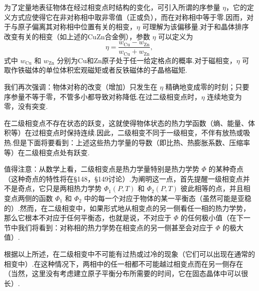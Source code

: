 为了定量地表征物体在经过相变点时结构的变化，可引入所谓的序参量 $\eta$，它的定义方式应使得它在非对称相中取非零值（正或负），而在对称相中等于零.因而，对于与原子偏离其对称相中位置有关的相变，$\eta$ 可理解为该偏移量.对于和晶体排序改变有关的相变（如上述的CuZn合金例），参数 $\eta$ 可以定义为
\begin{equation*}
  \eta=\frac{w_{\mathrm{Cu}}-w_{\mathrm{Zn}}}{w_{\mathrm{Cu}}+w_{\mathrm{Zn}}},
\end{equation*}
式中 $w_{\mathrm{Cu}}$ 和 $w_{\mathrm{Zn}}$ 分别为Cu和Zn原子处于任一给定格点的概率.对于磁相变，$\eta$ 可取作铁磁体的单位体积宏观磁矩或者反铁磁体的子晶格磁矩.

我们再次强调：物体对称的改变（增加）只发生在 $\eta$ 精确地变成零的时刻；只要序参量不等于零，不管多小都导致对称降低.在过二级相变点时，$\eta$ 连续地变为零，没有突变.

在二级相变点不存在状态的跃变，这就使得物体状态的热力学函数（熵、能量、体积等）在过相变点时保持连续.因此，二级相变不同于一级相变，不伴有放热或吸热.但是下面将要看到：上述这些热力学量的导数（即比热、热膨胀系数、压缩率等）在二级相变点处有跃变.

值得注意：从数学上看，二级相变点是热力学量特别是热力学势 $\Phi$ 的某种奇点（这种奇点的特性将在§148，§149讨论）.为阐明这一点，首先提醒一级相变点并不是奇点，它只是两相热力学势 $\Phi_1(P,T)$ 和 $\Phi_2(P,T)$ 彼此相等的点，并且相变点两侧的函数 $\Phi_1$ 和 $\Phi_2$ 中的每一个对应于物体的某一平衡态（虽然可能是亚稳的）.然而，在二级相变中，如果形式地从相变点的另一侧看任一相的热力学势，那么它根本不对应于任何平衡态，也就是说，不对应于 $\Phi$ 的任何极小值（在下一节中我们将看到：对称相的热力学势在相变点的另一侧甚至会对应于 $\Phi$ 的极大值）.

根据以上所述，在二级相变中不可能有过热或过冷的现象（它们可以出现在通常的相变中）.在这种情况下，两相中的任一相都不可能越过相变点而在另一侧存在（当然，这里没有考虑建立原子平衡分布所需要的时间，它在固态晶体中可以很长）.

